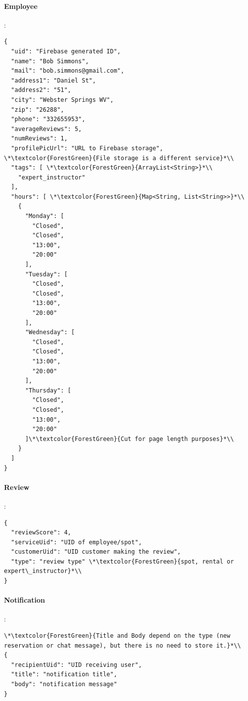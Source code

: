 \paragraph*{Employee}:
\begin{lstlisting}
{
  "uid": "Firebase generated ID",
  "name": "Bob Simmons",
  "mail": "bob.simmons@gmail.com",
  "address1": "Daniel St",
  "address2": "51",
  "city": "Webster Springs WV",
  "zip": "26288",
  "phone": "332655953",
  "averageReviews": 5,
  "numReviews": 1,
  "profilePicUrl": "URL to Firebase storage", \*\textcolor{ForestGreen}{File storage is a different service}*\\
  "tags": [ \*\textcolor{ForestGreen}{ArrayList<String>}*\\
    "expert_instructor"
  ],
  "hours": [ \*\textcolor{ForestGreen}{Map<String, List<String>>}*\\
    {
      "Monday": [
        "Closed",
        "Closed",
        "13:00",
        "20:00"
      ],
      "Tuesday": [
        "Closed",
        "Closed",
        "13:00",
        "20:00"
      ],
      "Wednesday": [
        "Closed",
        "Closed",
        "13:00",
        "20:00"
      ],
      "Thursday": [
        "Closed",
        "Closed",
        "13:00",
        "20:00"
      ]\*\textcolor{ForestGreen}{Cut for page length purposes}*\\
    }
  ]
}
\end{lstlisting}
\clearpage
\paragraph*{Review}:
\begin{lstlisting}
{
  "reviewScore": 4,
  "serviceUid": "UID of employee/spot",
  "customerUid": "UID customer making the review",
  "type": "review type" \*\textcolor{ForestGreen}{spot, rental or expert\_instructor}*\\
}
\end{lstlisting}
\paragraph*{Notification}:
\label{Par:Notification}
\begin{lstlisting}
\*\textcolor{ForestGreen}{Title and Body depend on the type (new reservation or chat message), but there is no need to store it.}*\\
{
  "recipientUid": "UID receiving user",
  "title": "notification title", 
  "body": "notification message"
}
\end{lstlisting}
